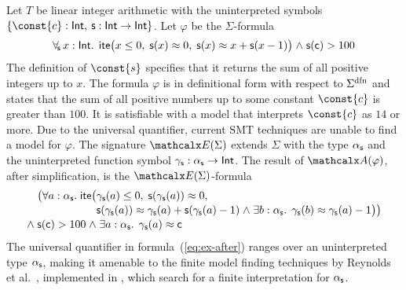 \begin{example}
\label{ex:translation}
Let $T$ be linear integer arithmetic
with the uninterpreted symbols  $\{ \const{c} : { \typeint },\allowbreak\> \con{s} : { \typeint \rightarrow \typeint } \}$.
Let $\varphi$ be the $\Sigma$-formula
\begin{equation} \label{eq:ex-before}
\forallf{\con{s}} x : {\typeint}.\;\, \lite\bigl( x \leq 0,\; \con{s}(x) \teq 0,\;
  \con{s}( x ) \teq x + \con{s}( x - 1 ) \bigr) \wedge \con{s}( \con{c} ) > 100
\end{equation}
%
The definition of $\const{s}$ specifies that it returns the sum of all
positive integers up to $x$. The formula $\varphi$ is in definitional form with
respect to $\sfundefs{\Sigma}$ 
and states that the sum of all
positive numbers up to some constant $\const{c}$ is greater than $100$. It is
satisfiable with a model that interprets $\const{c}$ as $14$ or more.
Due to the universal quantifier,
current SMT techniques
are unable to find
a model for $\varphi$. The signature $\extendsig{\Sigma}$ extends $\Sigma$ with the type
$\alpha_{\mathsf{s}}$ and the uninterpreted function symbol $\gamma_{\mathsf{s}} : \alpha_{\mathsf{s}}
\rightarrow \mathsf{Int}$. The result of $\conv( \varphi )$, after simplification, 
is the $\extendsig{\Sigma}$-formula
%
\begin{equation} \label{eq:ex-after}
\!\begin{aligned}[c]
  & \phantom{{\wedge}\; }\bigl(
      \forall a : \fargtype{\con{s}}.\; \lite\bigl(
        \!\begin{aligned}[t]
         &  \farg{\con{s}}( a ) \leq 0,\;
          \con{s}(\farg{\con{s}}( a )) \teq 0,\;
\\[-\jot]
  & \con{s}(\farg{\con{s}}( a )) \teq \farg{\con{s}}( a ) + \con{s}( \farg{\con{s}}( a )-1 )
    \wedge \exists b : {\fargtype{\con{s}}}.\;\, \farg{\con{s}}( b ) \teq \farg{\con{s}}( a )-1 \bigr) \bigr)
\end{aligned}
\\[-\jot]
 & {\wedge}\; \con{s}( \con{c} ) > 100 \wedge \exists a : {\fargtype{\con{s}}}.\;\, \farg{\con{s}}( a ) \teq \con{c}
\end{aligned}
\end{equation}
%
The universal quantifier in formula~(\ref{eq:ex-after}) ranges over an uninterpreted
type $\alpha_{\mathsf{s}}$, making it amenable to the finite model finding
techniques by Reynolds et al.\ \cite{ReyEtAl-1-RR-13,reynolds-et-al-2013},
implemented in \cvc, which search for a finite interpretation for $\alpha_{\mathsf{s}}$. 

\end{example}
